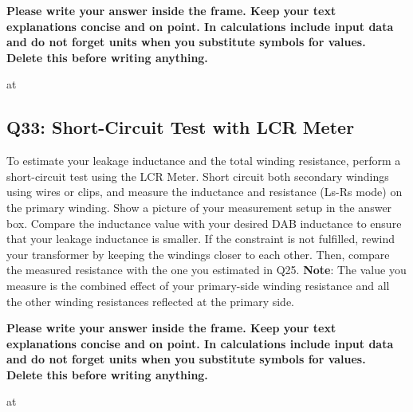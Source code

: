 \documentclass{PELsmallreport}
\begin{document}
\begin{framed}
	\vspace{2em}
	\textbf{Please write your answer inside the frame. Keep your text explanations concise and on point. In calculations include input data and do not forget units when you substitute symbols for values. \\ Delete this before writing anything.}
	\vspace{2em}
 
\end{framed}
 at   \hfill {}










\subsection{Q33: Short-Circuit Test with LCR Meter} 
To estimate your leakage inductance and the total winding resistance, perform a short-circuit test using the LCR Meter. 
Short circuit both secondary windings using wires or clips, and measure the inductance and resistance (Ls-Rs mode) on the primary winding. 
Show a picture of your measurement setup in the answer box. 
Compare the inductance value with your desired DAB inductance to ensure that your leakage inductance is smaller. 
If the constraint is not fulfilled, rewind your transformer by keeping the windings closer to each other. 
Then, compare the measured resistance with the one you estimated in Q25. 
\textbf{Note}: The value you measure is the combined effect of your primary-side winding resistance and all the other winding resistances reflected at the primary side.  
\begin{framed}
	\vspace{2em}
	\textbf{Please write your answer inside the frame. Keep your text explanations concise and on point. In calculations include input data and do not forget units when you substitute symbols for values. \\ Delete this before writing anything.}
	\vspace{2em}
\end{framed}

  \qquad {} at     \hfill {}
\end{document}
